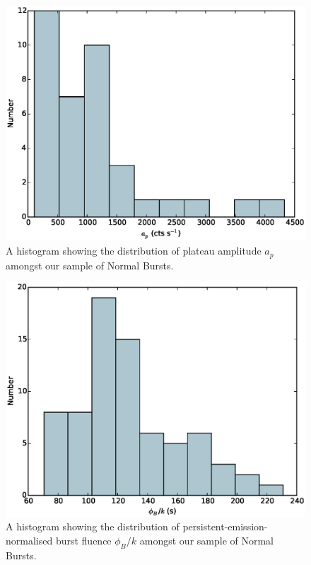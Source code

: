 \begin{figure}
  \centering
  \includegraphics[width=.9\linewidth, trim={0cm 0 0cm 0},clip]{images/appendix_plat_pa_hist.eps}
  \caption{\small A histogram showing the distribution of plateau amplitude $a_p$ amongst our sample of Normal Bursts.}
  \label{fig:app_hist_ap}
\end{figure}


\begin{figure}
  \centering
  \includegraphics[width=.9\linewidth, trim={0cm 0 0cm 0},clip]{images/appendix_burst_aafluence_n_hist.eps}
  \caption{\small A histogram showing the distribution of persistent-emission-normalised burst fluence $\phi_B/k$ amongst our sample of Normal Bursts.}
  \label{fig:app_hist_phib_n}
\end{figure}

